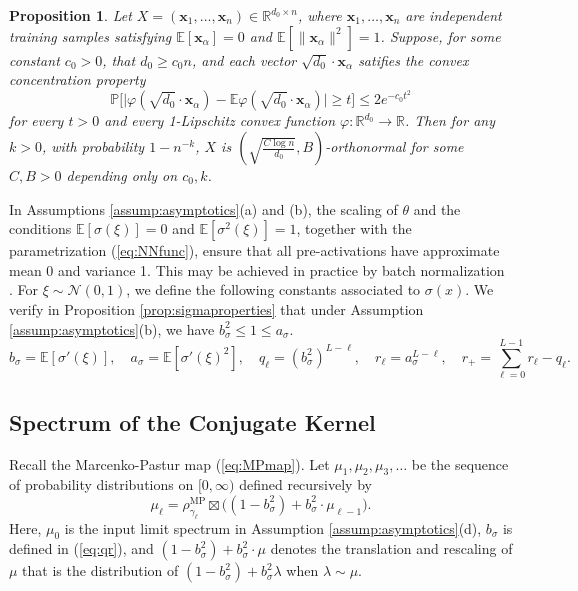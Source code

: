 \documentclass{article}
\newtheorem{proposition}[theorem]{Proposition}
\theoremstyle{definition}
\newcommand{\R}{\mathbb{R}}
\newcommand{\N}{\mathcal{N}}
\newcommand{\E}{\mathbb{E}}
\newcommand{\MP}{\text{MP}}
\newcommand{\x}{\mathbf{x}}
\renewcommand{\a}{\alpha}
\renewcommand{\P}{\mathbb{P}}
\newcommand{\1}{\mathbf{1}}
\begin{document}
\begin{proposition}\label{prop:inputisgood}
Let $X=(\x_1,\ldots,\x_n) \in \R^{d_0 \times n}$,
where $\x_1,\ldots,\x_n$ are independent training samples satisfying
$\E[\x_\a]=0$ and $\E[\|\x_\a\|^2]=1$. Suppose, for some
constant $c_0>0$, that $d_0 \geq c_0n$, and each vector $\sqrt{d_0}\cdot \x_\a$
satifies the convex concentration property
\[\P\Big[\big|\varphi(\sqrt{d_0} \cdot \x_\a)-\E \varphi(\sqrt{d_0} \cdot \x_\a)
\big| \geq t\Big] \leq 2e^{-c_0t^2}\]
for every $t>0$ and every 1-Lipschitz convex function $\varphi:\R^{d_0} \to \R$.
Then for any $k>0$, with probability $1-n^{-k}$,
$X$ is $(\sqrt{\frac{C\log n}{d_0}},B)$-orthonormal
for some $C,B>0$ depending only on $c_0,k$.
\end{proposition}

In Assumptions \ref{assump:asymptotics}(a) and (b), the scaling of $\theta$
and the conditions $\E[\sigma(\xi)]=0$ and $\E[\sigma^2(\xi)]=1$, together with
the parametrization (\ref{eq:NNfunc}),
ensure that all pre-activations have approximate mean 0 and variance 1.
This may be achieved in practice by batch
normalization \cite{ioffe2015batch}.
For $\xi \sim \N(0,1)$, we define the following constants associated
to $\sigma(x)$. We verify in Proposition \ref{prop:sigmaproperties} that under
Assumption \ref{assump:asymptotics}(b), we have
$b_\sigma^2 \leq 1 \leq a_\sigma$.
\begin{equation}\label{eq:qr}
b_\sigma=\E[\sigma'(\xi)], \quad a_\sigma=\E[\sigma'(\xi)^2],
\quad q_\ell=(b_\sigma^2)^{L-\ell}, \quad r_\ell=a_\sigma^{L-\ell},
\quad r_+=\sum_{\ell=0}^{L-1} r_\ell-q_\ell.
\end{equation}

\subsection{Spectrum of the Conjugate Kernel}\label{sec:CK}

Recall the Marcenko-Pastur map (\ref{eq:MPmap}).
Let $\mu_1,\mu_2,\mu_3,\ldots$ be the sequence of probability distributions on
$[0,\infty)$ defined recursively by
\begin{equation}\label{eq:muell}
\mu_\ell=\rho^\MP_{\gamma_\ell} \boxtimes \Big((1-b_\sigma^2)
+b_\sigma^2 \cdot \mu_{\ell-1}\Big).
\end{equation}
Here, $\mu_0$ is the input limit spectrum in Assumption
\ref{assump:asymptotics}(d), $b_\sigma$ is defined in (\ref{eq:qr}),
and $(1-b_\sigma^2)+b_\sigma^2 \cdot \mu$ denotes the translation and rescaling
of $\mu$ that is the
distribution of $(1-b_\sigma^2)+b_\sigma^2 \lambda$ when $\lambda \sim \mu$.
\end{document}

